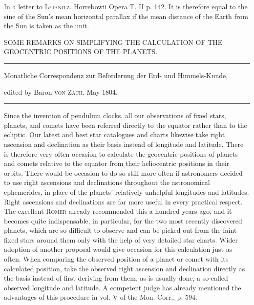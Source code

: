 \expandafter\def\csname HistoricalNoteText4\endcsname{In a letter to \textsc{Leibnitz}. Horrebowii Opera T. II p. 142.}
\expandafter\def\csname HistoricalNoteText5\endcsname{It is therefore equal to the sine of the Sun’s mean horizontal parallax if the mean
distance of the Earth from the Sun is taken as the unit.}
\clearpage{}%
\begin{center}
{\small SOME REMARKS ON SIMPLIFYING THE CALCULATION
OF THE GEOCENTRIC POSITIONS OF THE PLANETS.\par}
\medskip\hrule\medskip
{\small Monatliche Correspondenz zur Beförderung der Erd- und Himmels-Kunde,\par
edited by Baron \textsc{von Zach}. May 1804.\par}
\medskip\hrule
\end{center}\medskip
Since the invention of pendulum clocks, all our observations of fixed stars,
planets, and comets have been referred directly to the equator rather than to the
ecliptic. Our latest and best star catalogues and charts likewise take right
ascension and declination as their basis instead of longitude and latitude. There is
therefore very often occasion to calculate the geocentric positions of planets and
comets relative to the equator from their heliocentric positions in their orbits.
There would be occasion to do so still more often if astronomers decided to use right
ascensions and declinations throughout the astronomical ephemerides, in place of
the planets’ relatively unhelpful longitudes and latitudes. Right ascensions and
declinations are far more useful in every practical respect. The excellent
\textsc{Römer} already recommended this a hundred years ago, and it
becomes quite indispensable, in particular, for the two most recently discovered
planets, which are so difficult to observe and can be picked out from the faint
fixed stars around them only with the help of very detailed star charts. Wider
adoption of another proposal would give occasion for this calculation just as
often. When comparing the observed position
%
of a planet or comet with its calculated position, take the observed right
ascension and declination directly as the basis instead of first deriving from
them, as is usually done, a so-called observed longitude and latitude. A
competent judge has already mentioned the advantages of this procedure in
vol. V of the Mon. Corr., p. 594.

